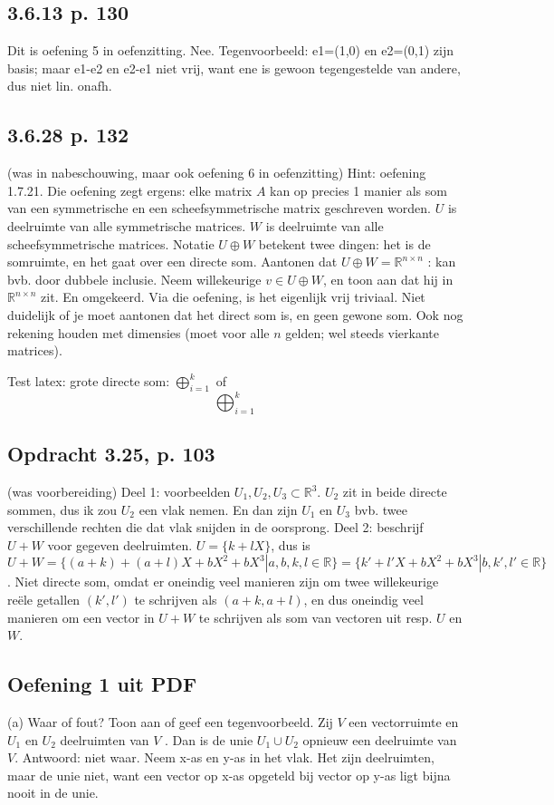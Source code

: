 \documentclass{article}
\begin{document}
\subsection{3.6.13 p. 130} 
Dit is oefening 5 in oefenzitting. 
Nee. Tegenvoorbeeld: e1=(1,0) en e2=(0,1) zijn basis; maar e1-e2 en e2-e1 niet vrij, want ene is gewoon tegengestelde van andere, dus niet lin. onafh. 


\subsection{3.6.28 p. 132}
(was in nabeschouwing, maar ook oefening 6 in oefenzitting) 
Hint: oefening 1.7.21. Die oefening zegt ergens: elke matrix $A$ kan op precies 1 manier als som van een symmetrische en een scheefsymmetrische matrix geschreven worden. 
$U$ is deelruimte van alle symmetrische matrices. $W$ is deelruimte van alle scheefsymmetrische matrices. 
Notatie $U \oplus W$ betekent twee dingen: het is de somruimte, en het gaat over een directe som. 
Aantonen dat $U \oplus W = \mathbb{R}^{n\times n}$ : kan bvb. door dubbele inclusie. Neem willekeurige $v \in U \oplus W$, en toon aan dat hij in $\mathbb{R}^{n\times n}$ zit. En omgekeerd. Via die oefening, is het eigenlijk vrij triviaal. Niet duidelijk of je moet aantonen dat het direct som is, en geen gewone som. Ook nog rekening houden met dimensies (moet voor alle $n$ gelden; wel steeds vierkante matrices). 

Test latex: grote directe som: $\bigoplus_{i=1}^k$ of \[ \bigoplus_{i=1}^k \]


\subsection{Opdracht 3.25, p. 103}
(was voorbereiding)  
Deel 1: voorbeelden $U_1, U_2, U_3 \subset \mathbb{R}^3$. $U_2$ zit in beide directe sommen, dus ik zou $U_2$ een vlak nemen. En dan zijn $U_1$ en $U_3$ bvb. twee verschillende rechten die dat vlak snijden in de oorsprong. 
Deel 2: beschrijf $U+W$ voor gegeven deelruimten. $U = \{ k + lX \}$, dus is $U+W = \{ (a+k) + (a+l)X + bX^2 + bX^3 | a,b,k,l \in \mathbb{R} \} = \{ k' + l'X + bX^2 + bX^3 | b,k',l' \in \mathbb{R} \}$. Niet directe som, omdat er oneindig veel manieren zijn om twee willekeurige re\"ele getallen $(k' , l')$ te schrijven als $(a+k, a+l)$, en dus oneindig veel manieren om een vector in $U+W$ te schrijven als som van vectoren uit resp. $U$ en $W$. 

\subsection{Oefening 1 uit PDF}
(a) Waar of fout? Toon aan of geef een tegenvoorbeeld. Zij $V$ een vectorruimte en $U_1$ en $U_2$ deelruimten van $V$ . Dan is de unie $U_1 \cup U_2$ opnieuw een deelruimte van $V$.
Antwoord: niet waar. Neem x-as en y-as in het vlak. Het zijn deelruimten, maar de unie niet, want een vector op x-as opgeteld bij vector op y-as ligt bijna nooit in de unie. 
\end{document}
